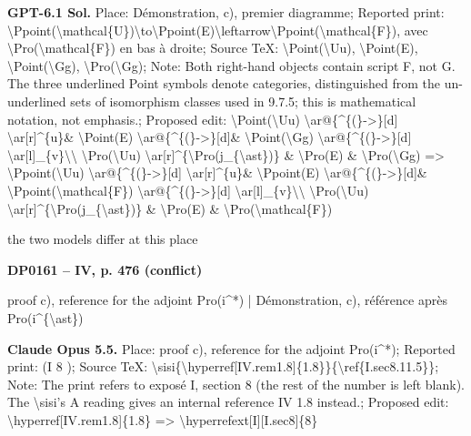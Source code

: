 \textbf{GPT-6.1 Sol.} Place: Démonstration, c), premier diagramme; Reported print: \textbackslash{}Ppoint(\textbackslash{}mathcal\{U\})\textbackslash{}to\textbackslash{}Ppoint(E)\textbackslash{}leftarrow\textbackslash{}Ppoint(\textbackslash{}mathcal\{F\}), avec \textbackslash{}Pro(\textbackslash{}mathcal\{F\}) en bas à droite; Source TeX: \textbackslash{}Point(\textbackslash{}Uu), \textbackslash{}Point(E), \textbackslash{}Point(\textbackslash{}Gg), \textbackslash{}Pro(\textbackslash{}Gg); Note: Both right-hand objects contain script F, not G. The three underlined Point symbols denote categories, distinguished from the un-underlined sets of isomorphism classes used in 9.7.5; this is mathematical notation, not emphasis.; Proposed edit: \textbackslash{}Point(\textbackslash{}Uu) \textbackslash{}ar@\{\textasciicircum{}\{(\}->\}[d] \textbackslash{}ar[r]\textasciicircum{}\{u\}\& \textbackslash{}Point(E) \textbackslash{}ar@\{\textasciicircum{}\{(\}->\}[d]\& \textbackslash{}Point(\textbackslash{}Gg) \textbackslash{}ar@\{\textasciicircum{}\{(\}->\}[d] \textbackslash{}ar[l]\_\{v\}\textbackslash{}\textbackslash{} \textbackslash{}Pro(\textbackslash{}Uu) \textbackslash{}ar[r]\textasciicircum{}\{\textbackslash{}Pro(j\_\{\textbackslash{}ast\})\}  \& \textbackslash{}Pro(E)   \& \textbackslash{}Pro(\textbackslash{}Gg) =\allowbreak > \textbackslash{}Ppoint(\textbackslash{}Uu) \textbackslash{}ar@\{\textasciicircum{}\{(\}->\}[d] \textbackslash{}ar[r]\textasciicircum{}\{u\}\& \textbackslash{}Ppoint(E) \textbackslash{}ar@\{\textasciicircum{}\{(\}->\}[d]\& \textbackslash{}Ppoint(\textbackslash{}mathcal\{F\}) \textbackslash{}ar@\{\textasciicircum{}\{(\}->\}[d] \textbackslash{}ar[l]\_\{v\}\textbackslash{}\textbackslash{} \textbackslash{}Pro(\textbackslash{}Uu) \textbackslash{}ar[r]\textasciicircum{}\{\textbackslash{}Pro(j\_\{\textbackslash{}ast\})\}  \& \textbackslash{}Pro(E)   \& \textbackslash{}Pro(\textbackslash{}mathcal\{F\})\par
the two models differ at this place\par
\par\noindent\hypertarget{DP0161}{}\textbf{DP0161 -- IV, p. 476 (conflict)}\par
proof c), reference for the adjoint Pro(i\textasciicircum{}*) | Démonstration, c), référence après Pro(i\textasciicircum{}\{\textbackslash{}ast\})\par
\textbf{Claude Opus 5.5.} Place: proof c), reference for the adjoint Pro(i\textasciicircum{}*); Reported print: (I 8    ); Source TeX: \textbackslash{}sisi\{\textbackslash{}hyperref[IV.rem1.8]\{1.8\}\}\{\textbackslash{}ref\{I.sec8.11.5\}\}; Note: The print refers to exposé I, section 8 (the rest of the number is left blank). The \textbackslash{}sisi's A reading gives an internal reference IV 1.8 instead.; Proposed edit: \textbackslash{}hyperref[IV.rem1.8]\{1.8\} =\allowbreak > \textbackslash{}hyperrefext[I][I.sec8]\{8\}\par
